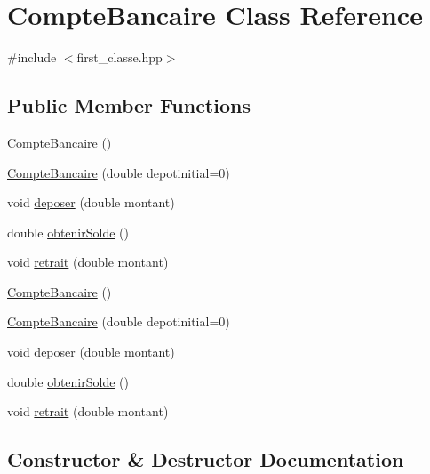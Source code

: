 \hypertarget{classCompteBancaire}{}\section{Compte\+Bancaire Class Reference}
\label{classCompteBancaire}


{\ttfamily \#include $<$first\+\_\+classe.\+hpp$>$}

\subsection*{Public Member Functions}
\begin{DoxyCompactItemize}
\item 
\hyperlink{classCompteBancaire_a86c02454bf4d466f8fa2700a3fbf5a65}{Compte\+Bancaire} ()
\item 
\hyperlink{classCompteBancaire_af6b65077975c98c4d89c99c553befd9d}{Compte\+Bancaire} (double depotinitial=0)
\item 
void \hyperlink{classCompteBancaire_a65eb7dd2d4c777f5cf78c0021d7490f3}{deposer} (double montant)
\item 
double \hyperlink{classCompteBancaire_a6ed81e6f30e6d8d31f5c3ffe7f9755c4}{obtenir\+Solde} ()
\item 
void \hyperlink{classCompteBancaire_ad25cfbad3651fd3a920b21a2d670826c}{retrait} (double montant)
\item 
\hyperlink{classCompteBancaire_a86c02454bf4d466f8fa2700a3fbf5a65}{Compte\+Bancaire} ()
\item 
\hyperlink{classCompteBancaire_af6b65077975c98c4d89c99c553befd9d}{Compte\+Bancaire} (double depotinitial=0)
\item 
void \hyperlink{classCompteBancaire_a65eb7dd2d4c777f5cf78c0021d7490f3}{deposer} (double montant)
\item 
double \hyperlink{classCompteBancaire_a6ed81e6f30e6d8d31f5c3ffe7f9755c4}{obtenir\+Solde} ()
\item 
void \hyperlink{classCompteBancaire_ad25cfbad3651fd3a920b21a2d670826c}{retrait} (double montant)
\end{DoxyCompactItemize}


\subsection{Constructor \& Destructor Documentation}
\mbox{\label{classCompteBancaire_a86c02454bf4d466f8fa2700a3fbf5a65}} 

